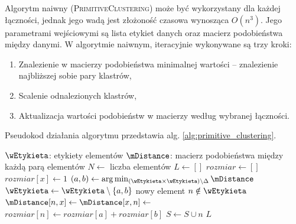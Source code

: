 \documentclass[a4paper,twoside,12pt]{book}
\newcommand{\procedura}[1]{\textsc{#1}}
\newcommand{\PrimitiveClustering}{\procedura{Pri\-mi\-ti\-ve\-Clu\-s\-te\-r\-ing}}
\begin{document}
Algorytm naiwny (\PrimitiveClustering{}) może być wykorzystany dla każdej łączności, jednak jego wadą jest złożoność czasowa wynosząca $O(n^{3})$.
Jego parametrami wejściowymi są lista etykiet danych oraz macierz podobieństwa między danymi. W algorytmie naiwnym, iteracyjnie wykonywane są trzy kroki:
\begin{enumerate}
	\item Znalezienie w macierzy podobieństwa minimalnej wartości -- znalezienie najbliższej sobie pary klastrów,
	\item Scalenie odnalezionych klastrów,
	\item Aktualizacja wartości podobieństw w macierzy według wybranej łączności.
\end{enumerate}
Pseudokod działania algorytmu przedstawia alg. \ref{alg:primitive_clustering}.

\begin{algorithm}[t]
	\caption{Naiwny algorytm aglomeracyjnego grupowania hierarchicznego \PrimitiveClustering{} \cite{bib:hierarchical-algorithms}}
	\label{alg:primitive_clustering}
	\begin{algorithmic}[1]
		\Require $\wEtykieta$: etykiety elementów
		\Require $\mDistance$: macierz podobieństwa między każdą parą elementów 
		\State $N \gets $ liczba elementów
		\State $L \gets [] $ 
		\State $rozmiar \gets []$ 
		\State $rozmiar[x] \gets 1$ 
		\EndFor
		\State $(a,b) \gets \arg\min_{(\wEtykieta \times \wEtykieta) \setminus \Delta}\mDistance$ 
		\State $\wEtykieta \gets \wEtykieta \setminus \{a, b\}$  
		\State nowy element $n \notin \wEtykieta$  
		\State $\mDistance[n, x] \gets \mDistance[x, n] \gets $   
		\EndFor
		\State $rozmiar[n] \gets rozmiar[a] + rozmiar[b]$
		\State $S \gets S \cup n$
		\EndFor
		\State \Return $L$  
		\EndProcedure
	\end{algorithmic}
\end{algorithm}
\end{document}

